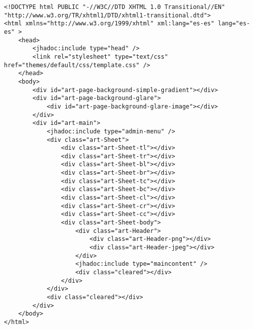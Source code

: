 \begin{lstlisting}[label=jha_plantilla_index,caption=Index de la plantilla.]
<!DOCTYPE html PUBLIC "-//W3C//DTD XHTML 1.0 Transitional//EN" "http://www.w3.org/TR/xhtml1/DTD/xhtml1-transitional.dtd">
<html xmlns="http://www.w3.org/1999/xhtml" xml:lang="es-es" lang="es-es" >
    <head>
        <jhadoc:include type="head" />
        <link rel="stylesheet" type="text/css" href="themes/default/css/template.css" />
    </head>
    <body>
        <div id="art-page-background-simple-gradient"></div>
        <div id="art-page-background-glare">
            <div id="art-page-background-glare-image"></div>
        </div>
        <div id="art-main">
            <jhadoc:include type="admin-menu" />
            <div class="art-Sheet">
                <div class="art-Sheet-tl"></div>
                <div class="art-Sheet-tr"></div>
                <div class="art-Sheet-bl"></div>
                <div class="art-Sheet-br"></div>
                <div class="art-Sheet-tc"></div>
                <div class="art-Sheet-bc"></div>
                <div class="art-Sheet-cl"></div>
                <div class="art-Sheet-cr"></div>
                <div class="art-Sheet-cc"></div>
                <div class="art-Sheet-body">
                    <div class="art-Header">
                        <div class="art-Header-png"></div>
                        <div class="art-Header-jpeg"></div>
                    </div>
                    <jhadoc:include type="maincontent" />
                    <div class="cleared"></div>
                </div>
            </div>
            <div class="cleared"></div>
        </div>
    </body> 
</html>
\end{lstlisting}
